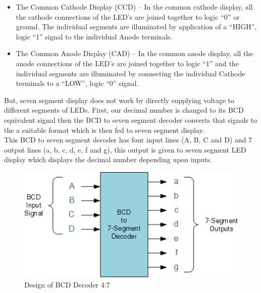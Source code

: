 \documentclass[12pt,singleside,a4paper]{article}
\begin{document}
\begin{itemize}
    \item The Common Cathode Display (CCD) – In the common cathode display, all the cathode connections of the LED’s are joined together to logic “0” or ground. The individual segments are illuminated by application of a “HIGH”, logic “1” signal to the individual Anode terminals.
    \item The Common Anode Display (CAD) – In the common anode display, all the anode connections of the LED’s are joined together to logic “1” and the individual segments are illuminated by connecting the individual Cathode terminals to a “LOW”, logic “0” signal.
\end{itemize} 
\noindent But, seven segment display does not work by directly supplying voltage to different segments of LEDs. First, our decimal number is changed to its BCD equivalent signal then the BCD to seven segment decoder converts that signals to the a suitable format which is then fed to seven segment display.
\\
\noindent  This BCD to seven segment decoder has four input lines (A, B, C and D) and 7 output lines (a, b, c, d, e, f and g), this output is given to seven segment LED display which displays the decimal number depending upon inputs.

\begin{center}
\begin{figure}[H]
    \centering
    \includegraphics[scale=1]{Circuit/bcd.png}
    \caption{Design of BCD Decoder 4:7 }
\end{figure}
\end{center}
\end{document}
